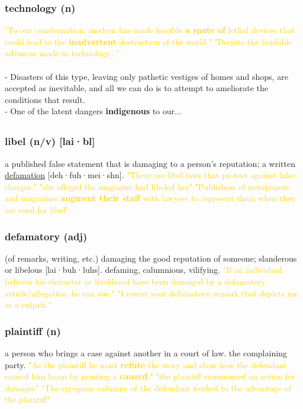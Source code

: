 \documentclass{proc}
\begin{document}
	\subsubsection{\textcolor{brickred}{technology} (n)}
	\textcolor{gold}{"To our consternation, modern has made feasible \textbf{a spate of} lethal devices that could lead to the \textbf{inadvertent} destruction of the world." "Despite the laudable advances made in technology..."}\\\\
	- Disasters of this type, leaving only pathetic vestiges of homes and shops, are accepted as inevitable, and all we can do is to attempt to ameliorate the conditions that result.\\
	- One of the latent dangers \textbf{indigenous} to our...
	
	\newpage
	\subsection{}
	\subsubsection{\textcolor{brickred}{libel} (n/v) [lai·bl]}
	a published false statement that is damaging to a person's reputation; a written \underline{defamation} [deh·fuh·mei·shn].
	\textcolor{gold}{"There are libel laws that protect against false charges." "she alleged the magazine had libeled her" "Publishers of newspapers and magazines \textbf{augment their staff} with lawyers to represent them when they are sued for libel"}
	
	\subsubsection{\textcolor{brickred}{defamatory} (adj)}
	(of remarks, writing, etc.) damaging the good reputation of someone; slanderous or libelous [lai·buh·luhs].
	defaming,
	calumnious,
	vilifying.
	\textcolor{gold}{"If an individual believes his character or livelihood have been damaged by a defamatory article/allegation, he can sue." "I resent your defamatory remark that depicts me as a culprit."}
	
	\subsubsection{\textcolor{brickred}{plaintiff} (n)}
	a person who brings a case against another in a court of law. the complaining party.
	\textcolor{gold}{"As the plaintiff he must \textbf{refute} the story and show how the defendant caused him harm by printing a \textbf{canard}." "the plaintiff commenced an action for damages" "The egregious calumny of the defendant worked to the advantage of the plaintiff"}
	
\end{document}
